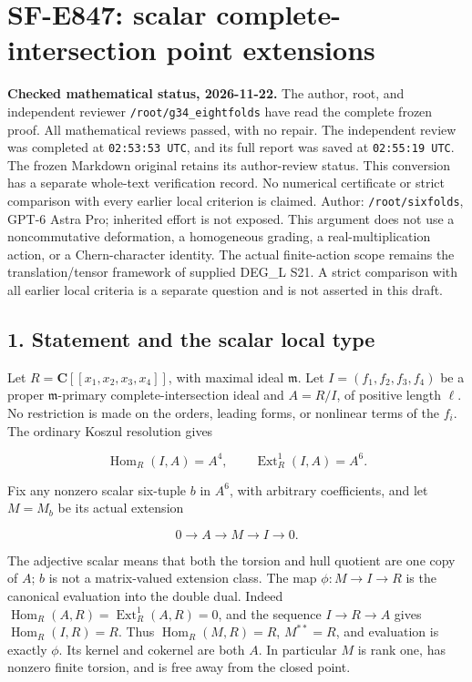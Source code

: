 \section{SF-E847: scalar complete-intersection point extensions}\label{SF-E847:section}

\textbf{Checked mathematical status, 2026-11-22.} The author, root,
and independent reviewer \texttt{/root/g34\_eightfolds} have read the
complete frozen proof. All mathematical reviews passed, with no repair.
The independent review was completed at \texttt{02:53:53 UTC}, and its
full report was saved at \texttt{02:55:19 UTC}. The frozen Markdown
original retains its author-review status. This conversion has a separate
whole-text verification record. No numerical certificate or strict
comparison with every earlier local criterion is claimed.
Author: \texttt{/root/sixfolds}, GPT-6 Astra Pro; inherited effort is not exposed.
This argument does not use a noncommutative deformation, a homogeneous
grading, a real-multiplication action, or a Chern-character identity.
The actual finite-action scope remains the translation/tensor framework
of supplied DEG\_L S21. A strict comparison with all earlier local criteria
is a separate question and is not asserted in this draft.

\subsection{1. Statement and the scalar local type}\label{SF-E847:s1}

Let \(R=\mathbf C[[x_1,x_2,x_3,x_4]]\), with maximal ideal \(\mathfrak m\). Let
\(I=(f_1,f_2,f_3,f_4)\) be a proper \(\mathfrak m\)-primary complete-intersection ideal and
\(A=R/I\), of positive length \(\ell\). No restriction is made on the orders,
leading forms, or nonlinear terms of the \(f_i\). The ordinary Koszul
resolution gives

\[
 \operatorname{Hom}_R(I,A)=A^4,\qquad
 \operatorname{Ext}^1_R(I,A)=A^6.
 \tag{SC.1}
\]

Fix any nonzero scalar six-tuple \(b\) in \(A^6\), with arbitrary coefficients,
and let \(M=M_b\) be its actual extension

\[
 0\longrightarrow A\longrightarrow M
       \longrightarrow I\longrightarrow0.
 \tag{SC.2}
\]

The adjective scalar means that both the torsion and hull quotient are
one copy of \(A\); \(b\) is not a matrix-valued extension class. The map
\(\phi:M\to I\to R\) is the canonical evaluation into the double dual. Indeed
\(\operatorname{Hom}_R(A,R)=\operatorname{Ext}^1_R(A,R)=0\), and the sequence \(I\to R\to A\) gives
\(\operatorname{Hom}_R(I,R)=R\). Thus \(\operatorname{Hom}_R(M,R)=R\), \(M^{**}=R\), and evaluation is exactly \(\phi\).
Its kernel and cokernel are both \(A\). In particular \(M\) is rank one,
has nonzero finite torsion, and is free away from the closed point.

